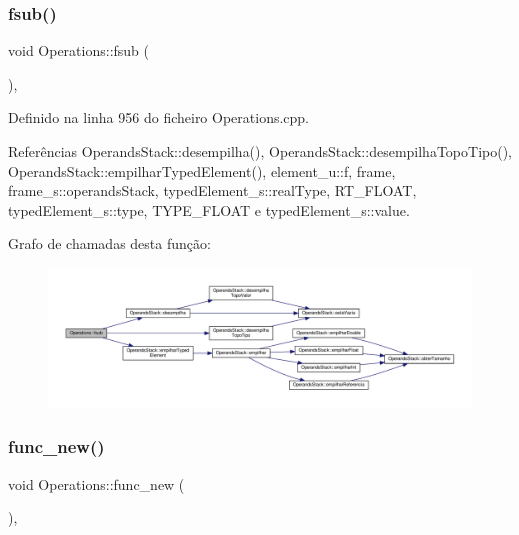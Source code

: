 \subsubsection{\texorpdfstring{fsub()}{fsub()}}
{\footnotesize\ttfamily void Operations\+::fsub (\begin{DoxyParamCaption}{ }\end{DoxyParamCaption})\hspace{0.3cm}{\ttfamily [static]}, {\ttfamily [private]}}



Definido na linha 956 do ficheiro Operations.\+cpp.



Referências Operands\+Stack\+::desempilha(), Operands\+Stack\+::desempilha\+Topo\+Tipo(), Operands\+Stack\+::empilhar\+Typed\+Element(), element\+\_\+u\+::f, frame, frame\+\_\+s\+::operands\+Stack, typed\+Element\+\_\+s\+::real\+Type, R\+T\+\_\+\+F\+L\+O\+AT, typed\+Element\+\_\+s\+::type, T\+Y\+P\+E\+\_\+\+F\+L\+O\+AT e typed\+Element\+\_\+s\+::value.

Grafo de chamadas desta função\+:\nopagebreak
\begin{figure}[H]
\begin{center}
\leavevmode
\includegraphics[width=350pt]{classOperations_a138cd74b7244e430085eb4850de2b481_cgraph}
\end{center}
\end{figure}
\mbox{\label{classOperations_a7594e147407e1f4ede57229899fd17d6}} 
\subsubsection{\texorpdfstring{func\+\_\+new()}{func\_new()}}
{\footnotesize\ttfamily void Operations\+::func\+\_\+new (\begin{DoxyParamCaption}{ }\end{DoxyParamCaption})\hspace{0.3cm}{\ttfamily [static]}, {\ttfamily [private]}}



